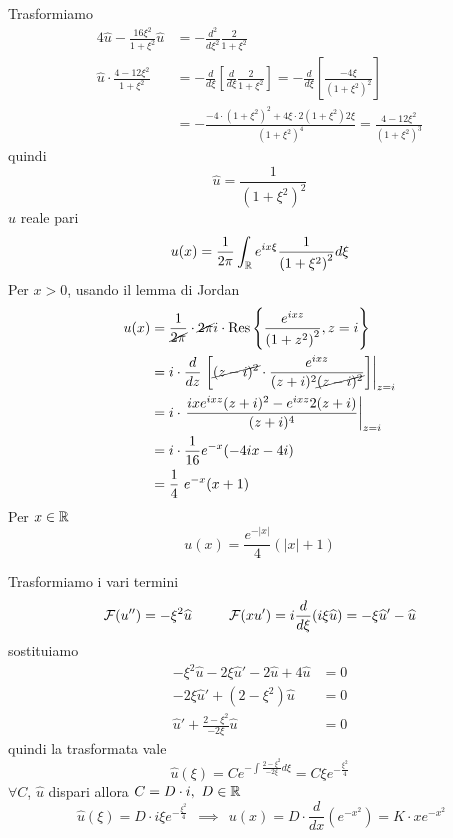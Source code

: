 Trasformiamo
\begin{align*}
4\hat{u} - \frac{16\xi ^{2}}{1 + \xi ^{2}}\hat{u} & = - \frac{d^{2}}{d\xi ^{2}}\frac{2}{1 + \xi ^{2}}\\
\hat{u} \cdot \frac{4 - 12\xi ^{2}}{1 + \xi ^{2}} & = - \frac{d}{d\xi }\left[\frac{d}{d\xi }\frac{2}{1 + \xi ^{2}}\right] = - \frac{d}{d\xi }\left[\frac{ - 4\xi }{\left(1 + \xi ^{2}\right)^{2}}\right]\\
 & = - \frac{ - 4\cdot \left(1 + \xi ^{2}\right)^{2} + 4\xi \cdot 2\left(1 + \xi ^{2}\right) 2\xi }{\left(1 + \xi ^{2}\right)^{4}} = \frac{4 - 12\xi ^{2}}{\left(1 + \xi ^{2}\right)^{3}}
\end{align*}
quindi
\begin{equation*}
\hat{u} = \frac{1}{\left(1 + \xi ^{2}\right)^{2}}
\end{equation*}
$\hat{u}$ reale pari
\begin{equation*}
u(x) = \frac{1}{2\pi }\int _{\mathbb{R} } e^{ix\xi }\frac{1}{\left(1 + \xi ^{2}\right)^{2}} d\xi 
\end{equation*}
Per $x > 0$, usando il lemma di Jordan
\begin{align*}
u(x) & = \frac{1}{\cancel{2\pi }} \cdot \cancel{2\pi } i\cdot \operatorname{Res} \left\{\frac{e^{ixz}}{\left(1 + z^{2}\right)^{2}} ,z = i\right\}\\
 & = i\cdot \frac{d}{dz}\left. \left[\cancel{(z - i)^{2}} \cdot \frac{e^{ixz}}{(z + i)^{2}\cancel{(z - i)^{2}}}\right]\right| _{z = i}\\
 & = i\cdot \left. \frac{ixe^{ixz}(z + i)^{2} - e^{ixz} 2(z + i)}{(z + i)^{4}}\right| _{z = i}\\
 & = i\cdot \frac{1}{16} e^{ - x}(- 4ix - 4i)\\
 & = \frac{1}{4} \ e^{ - x}(x + 1)
\end{align*}
Per $x\in \mathbb{R} $
\begin{equation*}
u(x) = \frac{e^{ - | x| }}{4}(| x| + 1)
\end{equation*}
\Soluzione

Trasformiamo i vari termini
\begin{equation*}
\mathcal{F} (u'') = - \xi ^{2}\widehat{u} \ \ \ \ \ \ \ \ \mathcal{F} (xu') = i\frac{d}{d\xi }(i\xi \widehat{u}) = - \xi \widehat{u} ' - \widehat{u}
\end{equation*}
sostituiamo
\begin{align*}
- \xi ^{2}\hat{u} - 2\xi \hat{u} ' - 2\hat{u} + 4\hat{u} & = 0\\
- 2\xi \hat{u} ' + \left(2 - \xi ^{2}\right)\hat{u} & = 0\\
\hat{u} ' + \frac{2 - \xi ^{2}}{ - 2\xi }\hat{u} & = 0
\end{align*}
quindi la trasformata vale
\begin{equation*}
\hat{u}(\xi) = Ce^{ - \int \frac{2 - \xi ^{2}}{ - 2\xi } d\xi } = C\xi e^{ - \frac{\xi ^{2}}{4}}
\end{equation*}
$\forall C$, $\hat{u}$ dispari allora $C = D\cdot i,\ D\in \mathbb{R} $
\begin{equation*}
\ \hat{u}(\xi) = D\cdot i\xi e^{ - \frac{\xi ^{2}}{4}} \ \ \implies \ \ u(x) = D\cdot \frac{d}{dx}\left(e^{ - x^{2}}\right) = K\cdot xe^{ - x^{2}}
\end{equation*}
